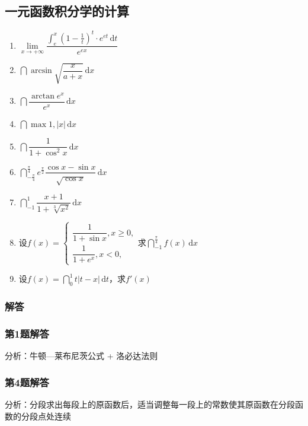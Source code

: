 \documentclass[./book.tex]{subfiles}
\begin{document}
    \subsection{一元函数积分学的计算}

    \begin{enumerate}
        \item $\lim\limits_{x\to +\infty}\dfrac{\int_e^x (1-\frac{1}{t})^t \cdot e^{et}\,\mathrm{d}t}{e^{ex}}$
        \item $\dint \arcsin \sqrt{\dfrac{x}{a+x}}\,\mathrm{d}x$
        \item $\dint\dfrac{\arctan e^x}{e^x}\,\mathrm{d}x$
        \item $\dint \max{1, |x|}\,\mathrm{d}x$
        \item $\dint \dfrac{1}{1 + \cos^2 x}\,\mathrm{d}x$
        \item $\dint_{-\frac{\pi}{4}}^{\frac{\pi}{4}} e^{\frac{\pi}{2}} \dfrac{\cos x - \sin x}{\sqrt{\cos x}}\,\mathrm{d}x$
        \item $\dint_{-1}^1 \dfrac{x+1}{1+\sqrt[3]{x^2}}\,\mathrm{d}x$
        \item 设$f(x) = \begin{cases}
                            \dfrac{1}{1+\sin x}, x \geq 0, \\
                            \dfrac{1}{1+e^x}, x < 0,
        \end{cases}$求$\dint_{-1}^\frac{\pi}{4} f(x)\,\mathrm{d}x$
        \item 设$f(x) = \dint_0^1 t|t-x|\,\mathrm{d}t$，求$f'(x)$
    \end{enumerate}

    \subsubsection{解答}

    \subsubsection*{第1题解答}
    \begin{analysisbox}
        分析：牛顿—莱布尼茨公式 + 洛必达法则
    \end{analysisbox}

    \subsubsection*{第4题解答}
    \begin{analysisbox}
        分析：分段求出每段上的原函数后，适当调整每一段上的常数使其原函数在分段函数的分段点处连续
    \end{analysisbox}
\end{document}
